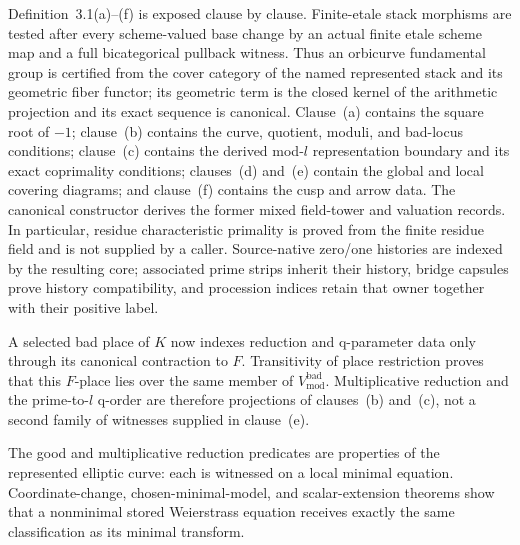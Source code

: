 \begin{definition}
  \leanok
  Definition~3.1(a)--(f) is exposed clause by clause.  Finite-etale stack
  morphisms are tested after every scheme-valued base change by an actual
  finite etale scheme map and a full bicategorical pullback witness.  Thus an
  orbicurve fundamental group is certified from the cover category of the
  named represented stack and its geometric fiber functor; its geometric term
  is the closed kernel of the arithmetic projection and its exact sequence is
  canonical.  Clause~(a) contains the
  square root of \(-1\); clause~(b) contains the curve, quotient, moduli, and
  bad-locus conditions; clause~(c) contains the derived mod-\(l\)
  representation boundary and its exact coprimality conditions; clauses~(d)
  and~(e) contain the global and local covering diagrams; and clause~(f)
  contains the cusp and arrow data.  The canonical constructor derives the
  former mixed field-tower and valuation records.  In particular, residue
  characteristic primality is proved from the finite residue field and is not
  supplied by a caller.  Source-native zero/one histories are indexed by the
  resulting core; associated prime strips inherit their history, bridge
  capsules prove history compatibility, and procession indices retain that
  owner together with their positive label.

  A selected bad place of \(K\) now indexes reduction and q-parameter data only
  through its canonical contraction to \(F\).  Transitivity of place
  restriction proves that this \(F\)-place lies over the same member of
  \(V_{\mathrm{mod}}^{\mathrm{bad}}\).  Multiplicative reduction and the
  prime-to-\(l\) q-order are therefore projections of clauses~(b) and~(c), not
  a second family of witnesses supplied in clause~(e).

  The good and multiplicative reduction predicates are properties of the
  represented elliptic curve: each is witnessed on a local minimal equation.
  Coordinate-change, chosen-minimal-model, and scalar-extension theorems show
  that a nonminimal stored Weierstrass equation receives exactly the same
  classification as its minimal transform.


\end{definition}
